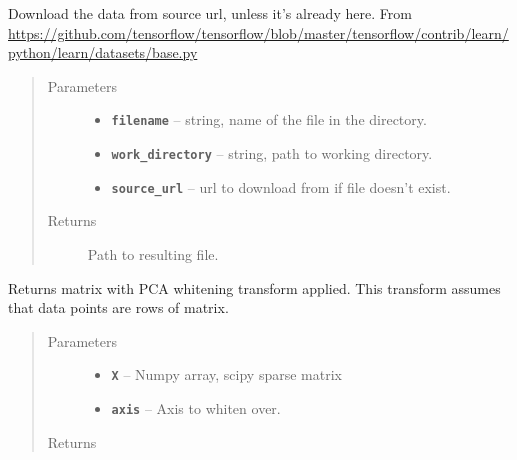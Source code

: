 \documentclass[letterpaper,10pt,english]{sphinxmanual}
\begin{document}

\begin{fulllineitems}
\label{loader:loader.maybe_download}
Download the data from source url, unless it's already here. From \href{https://github.com/tensorflow/tensorflow/blob/master/tensorflow/contrib/learn/python/learn/datasets/base.py}{https://github.com/tensorflow/tensorflow/blob/master/tensorflow/contrib/learn/python/learn/datasets/base.py}
\begin{quote}\begin{description}
\item[{Parameters}] \leavevmode\begin{itemize}
\item {} 
\textbf{\texttt{filename}} -- string, name of the file in the directory.

\item {} 
\textbf{\texttt{work\_directory}} -- string, path to working directory.

\item {} 
\textbf{\texttt{source\_url}} -- url to download from if file doesn't exist.

\end{itemize}

\item[{Returns}] \leavevmode
Path to resulting file.

\end{description}\end{quote}

\end{fulllineitems}


\begin{fulllineitems}
\label{loader:loader.pca_whiten}
Returns matrix with PCA whitening transform applied.
This transform assumes that data points are rows of matrix.
\begin{quote}\begin{description}
\item[{Parameters}] \leavevmode\begin{itemize}
\item {} 
\textbf{\texttt{X}} -- Numpy array, scipy sparse matrix

\item {} 
\textbf{\texttt{axis}} -- Axis to whiten over.

\end{itemize}

\item[{Returns}] \leavevmode


\end{description}\end{quote}

\end{fulllineitems}
\end{document}
